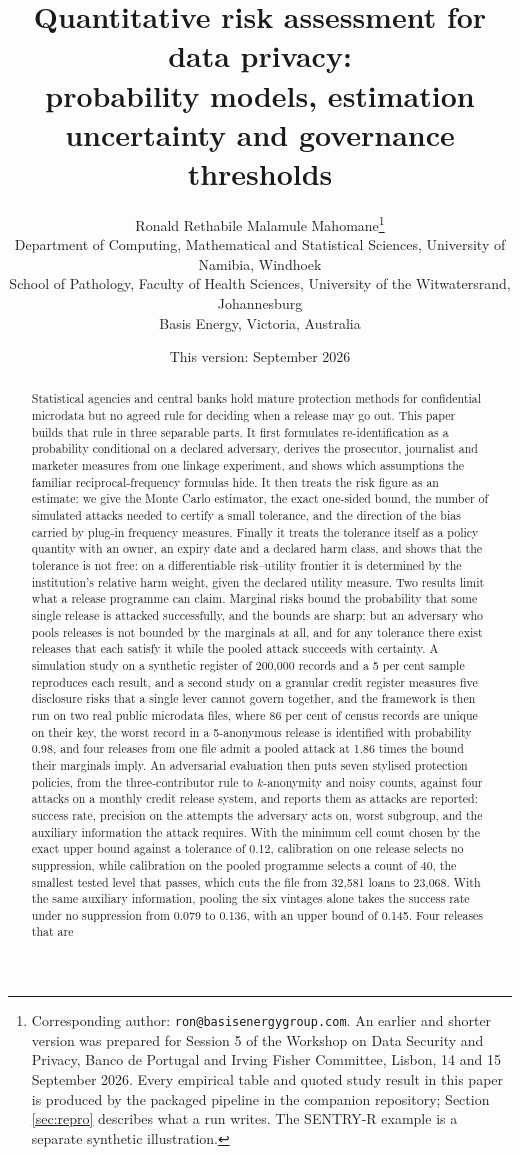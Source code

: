 \documentclass[11pt,a4paper]{article}
\title{\bfseries Quantitative risk assessment for data privacy:\\
probability models, estimation uncertainty and governance thresholds}
\author{Ronald Rethabile Malamule Mahomane\thanks{Corresponding author:
\texttt{ron@basisenergygroup.com}. An earlier and shorter version was prepared
for Session 5 of the Workshop on Data Security and Privacy, Banco de Portugal
and Irving Fisher Committee, Lisbon, 14 and 15 September 2026. Every
empirical table and quoted study result in this paper is produced by the
packaged pipeline in the companion repository; Section \ref{sec:repro} describes
what a run writes. The SENTRY-R example is a separate synthetic illustration.}\\
\small Department of Computing, Mathematical and Statistical Sciences,
University of Namibia, Windhoek\\
\small School of Pathology, Faculty of Health Sciences,
University of the Witwatersrand, Johannesburg\\
\small Basis Energy, Victoria, Australia}
\date{This version: September 2026}
\theoremstyle{plain}
\theoremstyle{definition}
\begin{document}
\maketitle

\begin{abstract}
\noindent Statistical agencies and central banks hold mature protection
methods for confidential microdata but no agreed rule for deciding when a
release may go out. This paper builds that rule in three separable parts. It
first formulates re-identification as a probability conditional on a declared
adversary, derives the prosecutor, journalist and marketer measures from one
linkage experiment, and shows which assumptions the familiar
reciprocal-frequency formulas hide. It then treats the risk figure as an
estimate: we give the Monte Carlo estimator, the exact one-sided bound, the
number of simulated attacks needed to certify a small tolerance, and the
direction of the bias carried by plug-in frequency measures. Finally it treats
the tolerance itself as a policy quantity with an owner, an expiry date and a
declared harm class, and shows that the tolerance is not free: on a
differentiable risk--utility frontier it is determined by the institution's
relative harm weight, given the declared utility measure. Two results limit what a release
programme can claim. Marginal risks bound the probability that some single
release is attacked successfully, and the bounds are sharp; but an adversary
who pools releases is not bounded by the marginals at all, and for any
tolerance there exist releases that each satisfy it while the pooled attack
succeeds with certainty. \medskip
\noindent A simulation study on a synthetic register of 200,000
records and a 5 per cent sample reproduces each result, and a second study on a
granular credit register measures five disclosure risks that a single lever cannot
govern together, and the framework is then run on two real public microdata files,
where 86 per cent of census records are unique on their key, the worst record in a
5-anonymous release is identified with probability 0.98, and four releases from one
file admit a pooled attack at 1.86 times the bound their marginals imply. An adversarial evaluation then puts seven stylised protection policies, from the three-contributor rule to $k$-anonymity and noisy counts, against four attacks on a monthly credit release system, and reports them as attacks are reported: success rate, precision on the attempts the adversary acts on, worst subgroup, and the auxiliary information the attack requires. With the minimum cell count chosen by the exact upper bound against a tolerance of 0.12, calibration on one release selects no suppression, while calibration on the pooled programme selects a count of 40, the smallest tested level that passes, which cuts the file from 32{,}581 loans to 23{,}068. With the same auxiliary information, pooling the six vintages alone takes the success rate under no suppression from 0.079 to 0.136, with an upper bound of 0.145. Four releases that are

\end{abstract}
\end{document}
